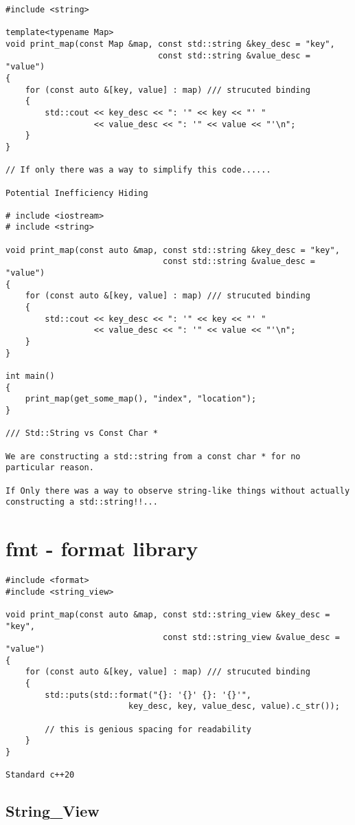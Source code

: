 \documentclass[openany]{report}
\begin{document}
\begin{verbatim}
#include <string>

template<typename Map>
void print_map(const Map &map, const std::string &key_desc = "key",
                               const std::string &value_desc = "value")
{
    for (const auto &[key, value] : map) /// strucuted binding
    {
        std::cout << key_desc << ": '" << key << "' "
                  << value_desc << ": '" << value << "'\n";
    }
}

// If only there was a way to simplify this code......

Potential Inefficiency Hiding

# include <iostream>
# include <string>

void print_map(const auto &map, const std::string &key_desc = "key",
                                const std::string &value_desc = "value")
{
    for (const auto &[key, value] : map) /// strucuted binding
    {
        std::cout << key_desc << ": '" << key << "' "
                  << value_desc << ": '" << value << "'\n";
    }
}

int main()
{
    print_map(get_some_map(), "index", "location");
}

/// Std::String vs Const Char *

We are constructing a std::string from a const char * for no particular reason.

If Only there was a way to observe string-like things without actually constructing a std::string!!...
\end{verbatim}

\section{fmt - format library}

\begin{verbatim}
#include <format>
#include <string_view>

void print_map(const auto &map, const std::string_view &key_desc = "key",
                                const std::string_view &value_desc = "value")
{
    for (const auto &[key, value] : map) /// strucuted binding
    {
        std::puts(std::format("{}: '{}' {}: '{}'",
                         key_desc, key, value_desc, value).c_str());

        // this is genious spacing for readability
    }
}

Standard c++20
\end{verbatim}
\subsection{String\_View}
\end{document}
